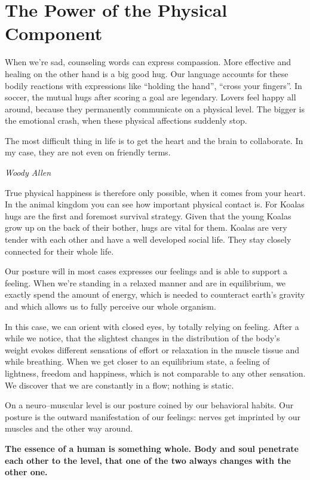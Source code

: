 \documentclass[../Book.Stress_regulation.tex]{subfiles}
\begin{document}
\section{The Power of the Physical Component}

When we're sad, counseling words can express compassion.
More effective and healing on the other hand is a big good hug.
Our language accounts for these bodily reactions with expressions like ``holding the hand'', ``cross your fingers''.
In soccer, the mutual hugs after scoring a goal are legendary.
Lovers feel happy all around, because they permanently communicate on a physical level.
The bigger is the emotional crash, when these physical affections suddenly stop.

\epigraph{The most difficult thing in life is to get the heart and the brain to collaborate. In my case, they are not even on friendly terms.}{\textit{Woody Allen}}

True physical happiness is therefore only possible, when it comes from your heart.
In the animal kingdom you can see how important physical contact is.
For Koalas hugs are the first and foremost survival strategy.
Given that the young Koalas grow up on the back of their bother, hugs are vital for them.
Koalas are very tender with each other and have a well developed social life.
They stay closely connected for their whole life.

Our posture will in most cases expresses our feelings and is able to support a feeling.
When we're standing in a relaxed manner and are in equilibrium, we exactly spend the amount of energy, which is needed to counteract earth's gravity
and which allows us to fully perceive our whole organism.

In this case, we can orient with closed eyes, by totally relying on feeling.
After a while we notice, that the slightest changes in the distribution of the body's weight evokes different sensations of effort or relaxation in the muscle tissue and while breathing.
When we get closer to an equilibrium state, a feeling of lightness, freedom and happiness, which is not comparable to any other sensation.
We discover that we are constantly in a flow; nothing is static.

On a neuro--muscular level is our posture coined by our behavioral habits.
Our posture is the outward manifestation of our feelings: nerves get imprinted by our muscles and the other way around.

\textbf{The essence of a human is something whole. Body and soul penetrate each other to the level, that one of the two always changes with the other one.}
\end{document}
